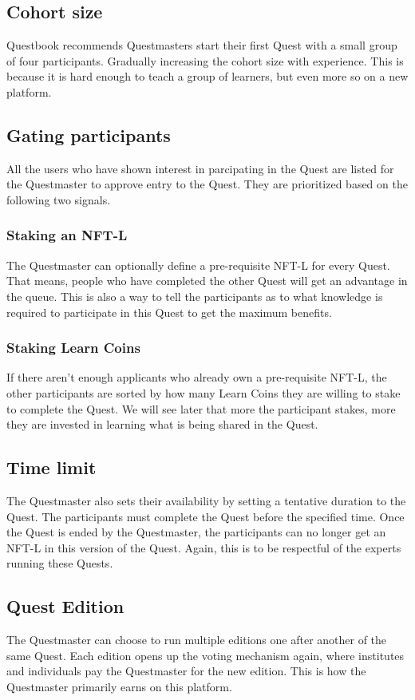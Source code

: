 \documentclass{article}
\begin{document}
    \subsection{Cohort size}
      Questbook recommends Questmasters start their first Quest with a small group of four participants. Gradually increasing the cohort size with experience. 
      This is because it is hard enough to teach a group of learners, but even more so on a new platform.
    \subsection{Gating participants}
      All the users who have shown interest in parcipating in the Quest are listed for the Questmaster to approve entry to the Quest. They are prioritized based on the following two signals.
      \subsubsection{Staking an NFT-L}
        The Questmaster can optionally define a pre-requisite NFT-L for every Quest. That means, people who have completed the other Quest will get an advantage in the queue.
        This is also a way to tell the participants as to what knowledge is required to participate in this Quest to get the maximum benefits. 
      \subsubsection{Staking Learn Coins}
        If there aren't enough applicants who already own a pre-requisite NFT-L, the other participants are sorted by how many Learn Coins they are willing to stake to complete the Quest.
        We will see later that more the participant stakes, more they are invested in learning what is being shared in the Quest.
    \subsection{Time limit}
      The Questmaster also sets their availability by setting a tentative duration to the Quest. The participants must complete the Quest before the specified time. Once the Quest is ended by the Questmaster, the participants can no longer get an NFT-L in this version of the Quest.
      Again, this is to be respectful of the experts running these Quests. 
    \subsection{Quest Edition}
      The Questmaster can choose to run multiple editions one after another of the same Quest. Each edition opens up the voting mechanism again, where institutes and individuals pay the Questmaster for the new edition. This is how the Questmaster primarily earns on this platform.
\end{document}
